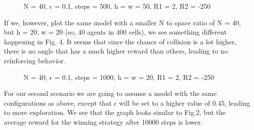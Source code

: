 \documentclass[a4paper]{article}
\begin{document}
\begin{figure}[h]
\caption{N = 40, $\epsilon$ = 0.1, steps = 500, h = w = 50, R1 = 2, R2 = -250} 
\end{figure}

If we, however, plot the same model with a smaller N to space ratio of N = 40, but h = 20, w = 20 (so, 40 agents in 400 cells), we see something different happening in Fig. 4. It seems that since the chance of collision is a lot higher, there is no angle that has a much higher reward than others, leading to no reinforcing behavior. 

\begin{figure}[h]
\caption{N = 40, $\epsilon$ = 0.1, steps = 1000, h = w = 20, R1 = 2, R2 = -250} 
\end{figure}

For our second scenario we are going to assume a model with the same configurations as above, except that $\epsilon$ will be set to a higher value of 0.45, leading to more exploration. We see that the graph looks similar to Fig.2, but the average reward for the winning strategy after 10000 steps is lower.
\end{document}

